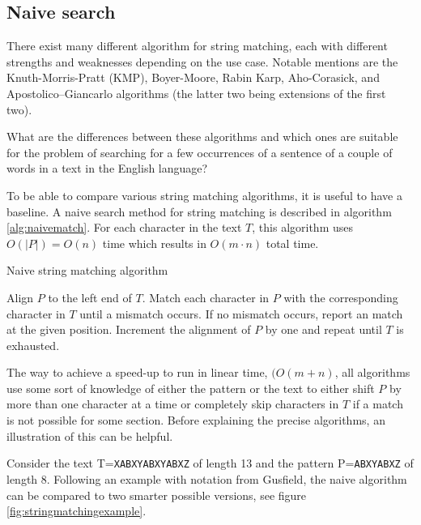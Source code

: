 \subsection{Naive search}

There exist many different algorithm for string matching, each with different strengths and weaknesses depending on the use case. Notable mentions are the Knuth-Morris-Pratt (KMP), Boyer-Moore, Rabin Karp, Aho-Corasick, and Apostolico–Giancarlo algorithms (the latter two being extensions of the first two). 

What are the differences between these algorithms and which ones are suitable for the problem of searching for a few occurrences of a sentence of a couple of words in a text in the English language? 

To be able to compare various string matching algorithms, it is useful to have a baseline. A naive search method for string matching is described in algorithm \ref{alg:naivematch}. For each character in the text $T$, this algorithm uses $O(|P|)=O(n)$ time which results in $O(m\cdot n)$ total time. 

\begin{algorithm}[t]
\caption{Naive string matching algorithm}\label{alg:naivematch}
\begin{algorithmic}
\State Align $P$ to the left end of $T$.
\State Match each character in $P$ with the corresponding character in $T$ until a mismatch occurs.
\State If no mismatch occurs, report an match at the given position.
\State Increment the alignment of $P$ by one and repeat until $T$ is exhausted. 
\end{algorithmic}
\end{algorithm}

The way to achieve a speed-up to run in linear time, $(O(m+n)$, all algorithms use some sort of knowledge of either the pattern or the text to either shift $P$ by more than one character at a time or completely skip characters in $T$ if a match is not possible for some section. Before explaining the precise algorithms, an illustration of this can be helpful. 

Consider the text T=\verb|XABXYABXYABXZ| of length 13 and the pattern P=\verb|ABXYABXZ| of length 8. Following an example with notation from Gusfield\cite{Gusfield1997AlgorithmsOS}, the naive algorithm can be compared to two smarter possible versions, see figure \ref{fig:stringmatchingexample}. 

